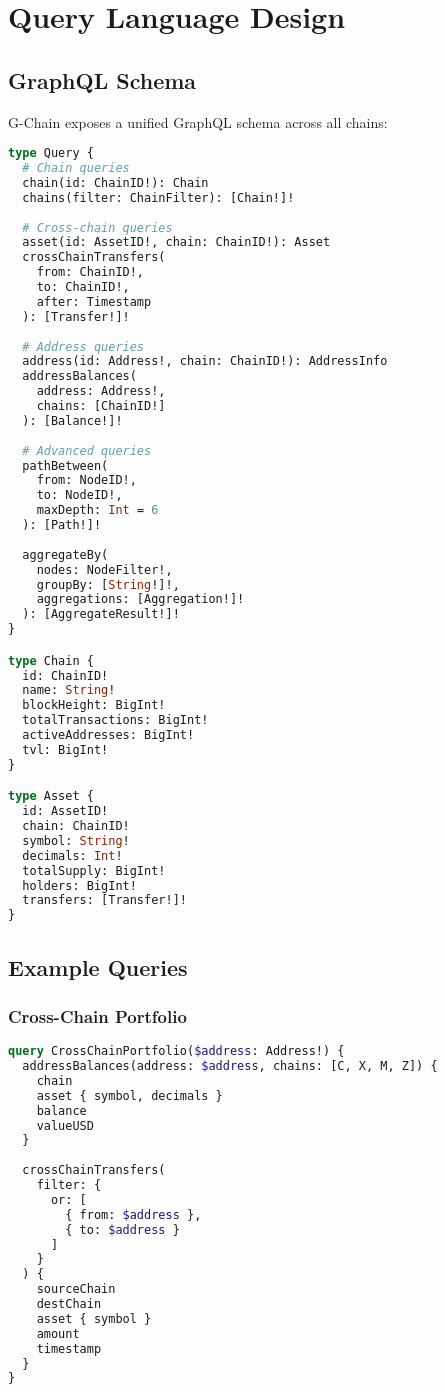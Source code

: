 \documentclass[11pt,a4paper]{article}
\begin{document}
\section{Query Language Design}

\subsection{GraphQL Schema}

G-Chain exposes a unified GraphQL schema across all chains:

\begin{lstlisting}[language=GraphQL, basicstyle=\small\ttfamily]
type Query {
  # Chain queries
  chain(id: ChainID!): Chain
  chains(filter: ChainFilter): [Chain!]!
  
  # Cross-chain queries
  asset(id: AssetID!, chain: ChainID!): Asset
  crossChainTransfers(
    from: ChainID!,
    to: ChainID!,
    after: Timestamp
  ): [Transfer!]!
  
  # Address queries
  address(id: Address!, chain: ChainID!): AddressInfo
  addressBalances(
    address: Address!,
    chains: [ChainID!]
  ): [Balance!]!
  
  # Advanced queries
  pathBetween(
    from: NodeID!,
    to: NodeID!,
    maxDepth: Int = 6
  ): [Path!]!
  
  aggregateBy(
    nodes: NodeFilter!,
    groupBy: [String!]!,
    aggregations: [Aggregation!]!
  ): [AggregateResult!]!
}

type Chain {
  id: ChainID!
  name: String!
  blockHeight: BigInt!
  totalTransactions: BigInt!
  activeAddresses: BigInt!
  tvl: BigInt!
}

type Asset {
  id: AssetID!
  chain: ChainID!
  symbol: String!
  decimals: Int!
  totalSupply: BigInt!
  holders: BigInt!
  transfers: [Transfer!]!
}
\end{lstlisting}

\subsection{Example Queries}

\subsubsection{Cross-Chain Portfolio}

\begin{lstlisting}[language=GraphQL, basicstyle=\small\ttfamily]
query CrossChainPortfolio($address: Address!) {
  addressBalances(address: $address, chains: [C, X, M, Z]) {
    chain
    asset { symbol, decimals }
    balance
    valueUSD
  }
  
  crossChainTransfers(
    filter: { 
      or: [
        { from: $address },
        { to: $address }
      ]
    }
  ) {
    sourceChain
    destChain
    asset { symbol }
    amount
    timestamp
  }
}
\end{lstlisting}
\end{document}
